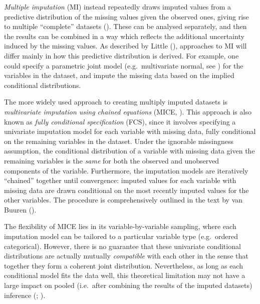 \documentclass[
  letterpaper,
  DIV=11,
  numbers=noendperiod]{scrreprt}
\begin{document}
\emph{Multiple imputation} (MI) instead repeatedly draws imputed values
from a predictive distribution of the missing values given the observed
ones, giving rise to multiple ``complete'' datasets
(). These can be analysed
separately, and then the results can be combined in a way which reflects
the additional uncertainty induced by the missing values. As described
by Little (),
approaches to MI will differ mainly in how this predictive distribution
is derived. For example, one could specify a parametric joint model
(e.g.~multivariate normal, see ) for the variables in the dataset, and impute the
missing data based on the implied conditional distributions.

The more widely used approach to creating multiply imputed datasets is
\emph{multivariate imputation using chained equations} (MICE,
). This approach is also known as \emph{fully
conditional specification} (FCS), since it involves specifying a
univariate imputation model for each variable with missing data, fully
conditional on the remaining variables in the dataset. Under the
ignorable missingness assumption, the conditional distribution of a
variable with missing data given the remaining variables is the
\emph{same} for both the observed and unobserved components of the
variable. Furthermore, the imputation models are iteratively ``chained''
together until convergence: imputed values for each variable with
missing data are drawn conditional on the most recently imputed values
for the other variables. The procedure is comprehensively outlined in
the text by van Buuren
().

The flexibility of MICE lies in its variable-by-variable sampling, where
each imputation model can be tailored to a particular variable type
(e.g.~ordered categorical). However, there is no guarantee that these
univariate conditional distributions are actually mutually
\emph{compatible} with each other in the sense that together they form a
coherent joint distribution. Nevertheless, as long as each conditional
model fits the data well, this theoretical limitation may not have a
large impact on pooled (i.e.~after combining the results of the imputed
datasets) inference
(; ).
\end{document}
